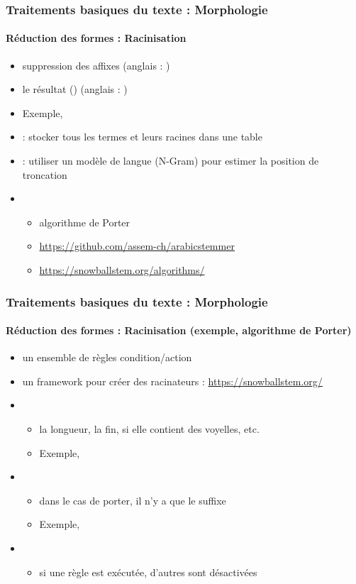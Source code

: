 \documentclass[xcolor=table]{beamer}
\begin{document}
\begin{frame}
\frametitle{Traitements basiques du texte : Morphologie}
\framesubtitle{Réduction des formes : Racinisation}

\begin{itemize}
	\item suppression des affixes (anglais : )
	\item le résultat  () (anglais : )
	\item Exemple, 
	\item {} : stocker tous les termes et leurs racines dans une table
	\item {} : utiliser un modèle de langue (N-Gram) pour estimer la position de troncation
	\item {}
	\begin{itemize}
		\item algorithme de Porter \cite{1980-porter}
		\item \url{https://github.com/assem-ch/arabicstemmer}
		\item \url{https://snowballstem.org/algorithms/}
	\end{itemize}
\end{itemize}

\end{frame}

\begin{frame}
\frametitle{Traitements basiques du texte : Morphologie}
\framesubtitle{Réduction des formes : Racinisation (exemple, algorithme de Porter)}

\begin{itemize}
	\item un ensemble de règles condition/action
	\item un framework pour créer des racinateurs : \url{https://snowballstem.org/}
	\item {}
	\begin{itemize}
		\item la longueur, la fin, si elle contient des voyelles, etc.
		\item Exemple, 
	\end{itemize}
	\item {}
	\begin{itemize}
		\item dans le cas de porter, il n'y a que le suffixe 
		\item Exemple, 
	\end{itemize}
	\item {}
	\begin{itemize}
		\item si une règle est exécutée, d'autres sont désactivées
	\end{itemize}
\end{itemize}

\end{frame}
\end{document}
